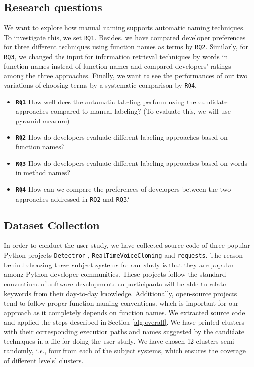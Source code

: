 \subsection{Research questions}
We want to explore how manual naming supports automatic naming techniques. To investigate this, we set \texttt{RQ1}.
Besides, we have compared developer preferences for three different techniques using function names as terms by \texttt{RQ2}. Similarly, for \texttt{RQ3}, we changed the input for information retrieval techniques by words in function names instead of function names and compared developers' ratings among the three approaches. Finally, we want to see the performances of our two variations of choosing terms by a systematic comparison by \texttt{RQ4}. 
\begin{itemize}
    
    \item \textbf{\texttt{RQ1}} How well does the automatic labeling perform using the candidate approaches compared to manual labeling?  (To evaluate this, we will use pyramid measure)
    \item \textbf{\texttt{RQ2}} How do developers evaluate different labeling approaches based on function names?
    \item \textbf{\texttt{RQ3}} How do developers evaluate different labeling approaches based on words in method names? 
    \item \textbf{\texttt{RQ4}} How can we compare the preferences of developers between the two approaches addressed in \texttt{RQ2} and \texttt{RQ3}? 
\end{itemize}
\subsection{Dataset Collection}

In order to conduct the user-study, we have collected source code of three popular Python projects \texttt{Detectron} \cite{Detectron2018}, \texttt{Real\-Time\-Voice\-Cloning} \cite{realTime} and \texttt{requests}\cite{requests}. The reason behind choosing these subject systems for our study is that they are popular among Python developer communities. These projects follow the standard conventions of software developments so participants will be able to relate keywords from their day-to-day knowledge. Additionally, open-source projects tend to follow proper function naming conventions, which is important for our approach as it completely depends on function names. We extracted source code and applied the steps described in Section \ref{alg:overall}. We have printed clusters with their corresponding execution paths and names suggested by the candidate techniques in a file for doing the user-study. We have chosen 12 clusters semi-randomly, i.e.,  four from each of the subject systems, which ensures the coverage of different levels' clusters. 
